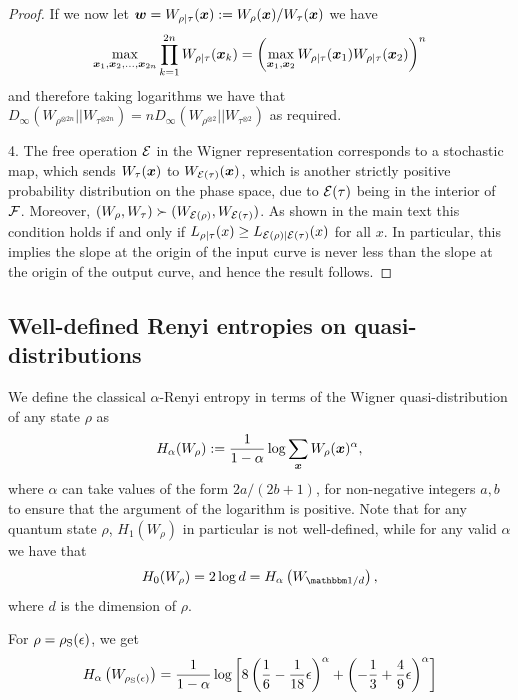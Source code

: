 \documentclass[pra,
aps,
twocolumn,
superscriptaddress,
groupedaddress,
nofootinbib,
reprint
]{revtex4-1}
\begin{document}
\begin{proof}
If we now let $\boldsymbol{w} = W_{\rho|\tau}(\boldsymbol{x}) := W_{\rho}(\boldsymbol{x}) /W_{\tau}(\boldsymbol{x})$ we have
\begin{equation}
\max_{\boldsymbol{x}_1, \boldsymbol{x}_2, \dots ,\boldsymbol{x}_{2n}} \prod_{k=1}^{2n} W_{\rho|\tau}(\boldsymbol{x}_k) = \left( \max_{\boldsymbol{x}_1, \boldsymbol{x}_2} W_{\rho|\tau}(\boldsymbol{x}_1)W_{\rho|\tau}(\boldsymbol{x}_2) \right)^n
\end{equation}
and therefore taking logarithms we have that $D_\infty(W_{\rho^{\otimes 2n}} || W_{\tau^{\otimes 2n}}) = n D_\infty(W_{\rho^{\otimes 2}} || W_{\tau^{\otimes 2}})$ as required.

4. The free operation ${\mathcal E}$ in the Wigner representation corresponds to a stochastic map, which sends $W_\tau(\boldsymbol{x})$ to $W_{{\mathcal E}(\tau)}(\boldsymbol{x})$, which is another strictly positive probability distribution on the phase space, due to ${\mathcal E}(\tau)$ being in the interior of ${\mathcal F}$. Moreover, $(W_\rho, W_\tau ) \succ (W_{{\mathcal E}(\rho)} , W_{{\mathcal E}(\tau)})$. As shown in the main text this condition holds if and only if $L_{\rho|\tau}(x) \ge L_{{\mathcal E}(\rho)|{\mathcal E}(\tau)}(x)$ for all $x$. In particular, this implies the slope at the origin of the input curve is never less than the slope at the origin of the output curve, and hence the result follows.
\end{proof}

\subsection{Well-defined Renyi entropies on quasi-distributions}

We define the classical $\alpha$-Renyi entropy in terms of the Wigner quasi-distribution of any state $\rho$ as
\begin{equation}
	H_\alpha(W_\rho) := \frac{1}{1-\alpha} \log \sum_{\bm{x}} W_{\rho}(\bm{x})^\alpha,
\end{equation}
where $\alpha$ can take values of the form $2a / (2b+1)$, for non-negative integers $a,b$ to ensure that the argument of the logarithm is positive.
Note that for any quantum state $\rho$, $H_1(W_\rho)$ in particular is not well-defined, while for any valid $\alpha$ we have that
\begin{equation}
	H_0(W_\rho) = 2\log d = H_\alpha \left( W_{\id/d} \right),
\end{equation}
where $d$ is the dimension of $\rho$.

For $\rho = \rho_{\rm{S}}(\epsilon)$, we get
\begin{align}
	&H_{\alpha}\left(W_{\rho_{\rm{S}}(\epsilon)}\right) = \frac{1}{1-\alpha}\log \left[ 8\left( \frac{1}{6} - \frac{1}{18}\epsilon \right)^\alpha + \left(-\frac{1}{3} + \frac{4}{9}\epsilon \right)^\alpha \right] \nonumber\\
\end{align}
\end{document}
